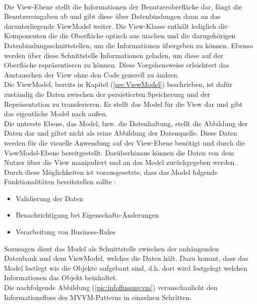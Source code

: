 \\
Die View-Ebene stellt die Informationen der Benutzeroberfläche dar, fängt die Benutzereingaben ab 
und gibt diese über Datenbindungen dann an das darunterliegende ViewModel weiter. Die View-Klasse enthält lediglich die Komponenten die 
die Oberfläche optisch aus machen und die dazugehörigen Datenbindungsschnittstellen, um die Informationen übergeben zu können.
Ebenso werden über diese Schnittstelle Informationen geladen, um diese auf der Oberfläche repräsentieren zu können. 
Diese Vorgehensweise erleichtert das Austauschen der View ohne den Code generell zu ändern. 
\\ 
\linebreak 
Die ViewModel, bereits in Kapitel (\ref{sec:ViewModel}) beschrieben, ist dafür zuständig die Daten zwischen der persistierten Speicherung 
und der Repräsentation zu transferieren. Es stellt das Model für die View dar und gibt das eigentliche Model nach außen.
\\ 
\linebreak 
Die unterste Ebene, das Model, bzw. die Datenhaltung, stellt die Abbildung der Daten dar und giltet nicht  als reine Abbildung der Datenquelle. 
Diese Daten werden für die visuelle Anwendung auf der View-Ebene benötigt und durch die ViewModel-Ebene bereitgestellt. Darüberhinaus können die 
Daten von dem Nutzer über die View manipuliert und an das Model zurückgegeben werden. Durch diese Möglichkeiten ist vorausgesetzte, dass das Model 
folgende Funktionalitäten bereitstellen sollte \cite{mvvmAufbau.2016}:
\begin{itemize}
    \item Validierung der Daten
    \item  Benachrichtigung bei Eigenschafts-Änderungen
    \item Verarbeitung von Business-Rules
\end{itemize} 
Sozusagen dient das Model als Schnittstelle zwischen der anhängenden Datenbank und dem ViewModel, welches die Daten hält. 
Dazu kommt, dass das Model festlegt wie die Objekte aufgebaut sind, d.h. dort wird festgelegt welchen Informationen das Objekt beinhaltet. 
\\ 
\linebreak
Die nachfolgende Abbildung (\ref{pic:infoflussmvvm}) veranschaulicht den Informationsfluss des MVVM-Patterns in einzelnen Schritten.
